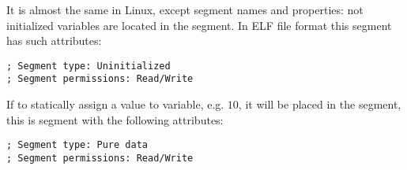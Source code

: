 {It is almost the same in Linux, except segment names and properties: 
not initialized variables are located in the  segment. 
In \ac{ELF} file format this segment has such attributes:}

\begin{lstlisting}
; Segment type: Uninitialized
; Segment permissions: Read/Write
\end{lstlisting}

{If to statically assign a value to variable, e.g. $10$, it will be placed in the  segment, 
this is segment with the following attributes:}

\begin{lstlisting}
; Segment type: Pure data
; Segment permissions: Read/Write
\end{lstlisting}




